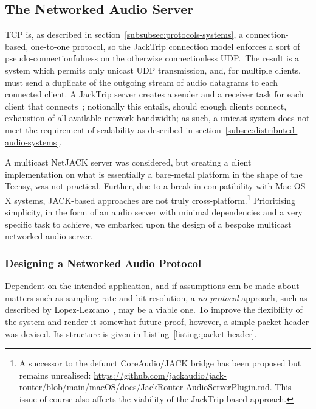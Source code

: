 \documentclass[utf8]{FrontiersinHarvard}
\newcommand{\secref}[1]{section~\ref{#1}}
\newcommand{\lstref}[1]{Listing~\ref{#1}}
\begin{document}
    \subsection{The Networked Audio Server}\label{subsec:the-networked-audio-server}

    TCP is, as described in \secref{subsubsec:protocols-systems}, a
    connection-based, one-to-one protocol, so the JackTrip connection model enforces
    a sort of pseudo-connectionfulness on the otherwise connectionless UDP.\
    The result is a system which permits only unicast UDP transmission, and, for
    multiple clients, must send a duplicate of the outgoing stream of audio
    datagrams to each connected client.
    A JackTrip server creates a sender and a receiver task for each client that
    connects~\citep{caceres_jacktrip_2010};
    notionally this entails, should enough clients connect, exhaustion of all
    available network bandwidth;
    as such, a unicast system does not meet the requirement of scalability as
    described in \secref{subsec:distributed-audio-systems}.

    A multicast NetJACK server was considered, but creating a client
    implementation on what is essentially a bare-metal platform in the shape of
    the Teensy, was not practical.
    Further, due to a break in compatibility with Mac OS X systems, JACK-based
    approaches are not truly cross-platform.\footnote{
        A successor to the defunct CoreAudio/JACK bridge has been proposed but
        remains unrealised:
        \url{https://github.com/jackaudio/jack-router/blob/main/macOS/docs/JackRouter-AudioServerPlugin.md}.
        This issue of course also affects the viability of the JackTrip-based
        approach.
    }
    Prioritising simplicity, in the form of an audio server with minimal
    dependencies and a very specific task to achieve, we embarked upon the
    design of a bespoke multicast networked audio server.

    \subsubsection{Designing a Networked Audio Protocol}\label{subsubsec:designing-a-protocol}

    Dependent on the intended application, and if assumptions can be made about
    matters such as sampling rate and bit resolution, a \textit{no-protocol}
    approach, such as described by
    Lopez-Lezcano~\citep{lopez-lezcano_jack_2012}, may be a viable one.
    To improve the flexibility of the system and render it somewhat
    future-proof, however, a simple packet header was devised.
    Its structure is given in \lstref{listing:packet-header}.
\end{document}
